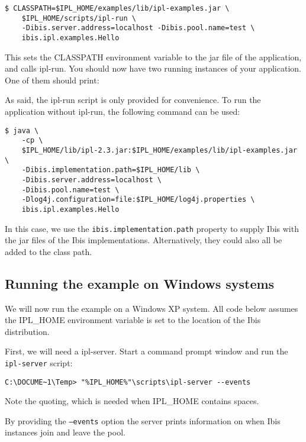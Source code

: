 \documentclass[a4paper,10pt]{article}
\begin{document}
\noindent
{\small
\begin{verbatim}
$ CLASSPATH=$IPL_HOME/examples/lib/ipl-examples.jar \
    $IPL_HOME/scripts/ipl-run \
    -Dibis.server.address=localhost -Dibis.pool.name=test \
    ibis.ipl.examples.Hello
\end{verbatim}
}
\noindent

This sets the CLASSPATH environment variable to the jar file of the
application, and calls ipl-run. You should now have two running
instances of your application. One of them should print:

\noindent {\small \begin{verbatim} Server received: Hi there
\end{verbatim} } \noindent 

As said, the ipl-run script is only provided for convenience. To run
the application without ipl-run, the following command can be used:

\noindent
{\small
\begin{verbatim}
$ java \
    -cp \
    $IPL_HOME/lib/ipl-2.3.jar:$IPL_HOME/examples/lib/ipl-examples.jar \
    -Dibis.implementation.path=$IPL_HOME/lib \
    -Dibis.server.address=localhost \
    -Dibis.pool.name=test \
    -Dlog4j.configuration=file:$IPL_HOME/log4j.properties \
    ibis.ipl.examples.Hello
\end{verbatim}
}
\noindent

In this case, we use the \texttt{ibis.implementation.path} property to supply Ibis
with the jar files of the Ibis implementations. Alternatively, they
could also all be added to the class path.

\subsection{Running the example on Windows systems}

We will now run the example on a Windows XP system.
All code below assumes the IPL\_HOME
environment variable is set to the location of the Ibis distribution.

First, we will need a ipl-server. Start a command prompt window and
run the \texttt{ipl-server} script:
\noindent
{\small
\begin{verbatim}
C:\DOCUME~1\Temp> "%IPL_HOME%"\scripts\ipl-server --events
\end{verbatim}
}
\noindent

Note the quoting, which is needed when IPL\_HOME contains spaces.

By providing the \texttt{--events} option the server 
prints information on when Ibis instances join and leave the pool.
\end{document}
